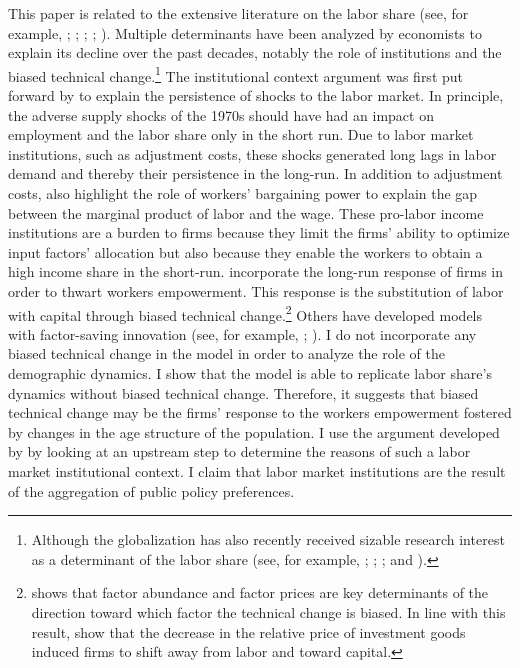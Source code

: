 This paper is related to the extensive literature on the labor share (see, for example, \citealt{Blanchard1997}; \citealt{Caballero1998}; \citealt{Acemoglu2003}; \citealt{Karabarbounis2014}; \citealt{Autor2019}). Multiple determinants have been analyzed by economists to explain its decline over the past decades, notably the role of institutions and the biased technical change.\footnote{Although the globalization has also recently received sizable research interest as a determinant of the labor share (see, for example, \citealt{Jayadev2007}; \citealt{Pica2010}; \citealt{Young2018}; and \citealt{Autor2019}).}
The institutional context argument was first put forward by \cite{Blanchard1997} to explain the persistence of shocks to the labor market. In principle, the adverse supply shocks of the 1970s should have had an impact on employment and the labor share only in the short run. Due to labor market institutions, such as adjustment costs, these shocks generated long lags in labor demand and thereby their persistence in the long-run.
In addition to adjustment costs, \cite{Bentolila2003} also highlight the role of workers' bargaining power to explain the gap between the marginal product of labor and the wage.
These pro-labor income institutions are a burden to firms because they limit the firms' ability to optimize input factors' allocation but also because they enable the workers to obtain a high income share in the short-run. \cite{Caballero1998} incorporate the long-run response of firms in order to thwart workers empowerment. This response is the substitution of labor with capital through biased technical change.\footnote{\cite{Acemoglu2002} shows that factor abundance and factor prices are key determinants of the direction toward which factor the technical change is biased. In line with this result, \cite{Karabarbounis2014} show that the decrease in the relative price of investment goods induced firms to shift away from labor and toward capital.
} Others have developed models with factor-saving innovation (see, for example, \citealt{Zuleta2008}; \citealt{Peretto2013}).
I do not incorporate any biased technical change in the model in order to analyze the role of the demographic dynamics. I show that the model is able to replicate labor share's dynamics without biased technical change. Therefore, it suggests that biased technical change may be the firms' response to the workers empowerment fostered by changes in the age structure of the population. I use the argument developed by \cite{Caballero1998} by looking at an upstream step to determine the reasons of such a labor market institutional context. I claim that labor market institutions are the result of the aggregation of public policy preferences.

